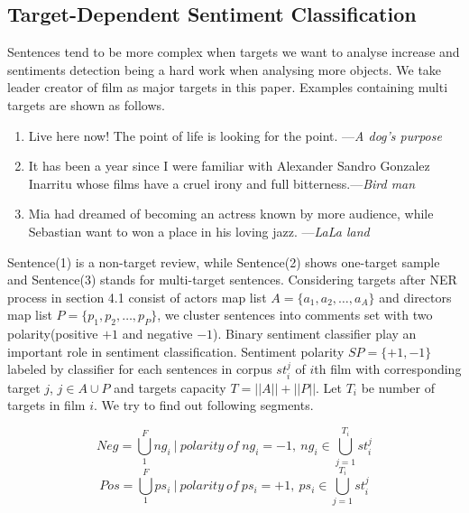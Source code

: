 \subsection{Target-Dependent Sentiment Classification}
\par Sentences tend to be more complex when targets we want to analyse increase and sentiments detection being a hard work when analysing more objects. We take leader creator of film as major targets in this paper. Examples containing multi targets are shown as follows.
\begin{enumerate}
  \item Live here now! The point of life is looking for the point. ---\emph{A dog's purpose}
  \item It has been a year since I were familiar with Alexander Sandro Gonzalez Inarritu whose films have a cruel irony and full bitterness.---\emph{Bird man}
  \item Mia had dreamed of becoming an actress known by more audience, while Sebastian want to won a place in his loving jazz. ---\emph{LaLa land}
\end{enumerate}
\par  Sentence(1) is a non-target review, while Sentence(2) shows one-target sample and Sentence(3) stands for multi-target sentences. Considering targets after NER process in section 4.1 consist of actors map list $A=\{a_1, a_2, \dots, a_A\}$ and directors map list $P=\{p_1, p_2, \dots, p_P\}$, we cluster sentences into comments set with two polarity(positive $+1$ and negative $-1$). Binary sentiment classifier play an important role in sentiment classification. Sentiment polarity $SP=\{+1, -1\}$ labeled by classifier for each sentences in corpus $st_i^j$ of $i$th film with corresponding target $j$, $j \in A \cup P $ and targets capacity $T = ||A||+||P||$. Let $T_i$ be number of targets in film $i$. We try to find out following segments.

\begin{equation}
    Neg=\bigcup_1^{F} ng_i \ | \ polarity \ of \ ng_i = -1, \ ng_i \in \bigcup_{j=1}^{T_i} st_i^j
    \label{eq:neg}
\end{equation}
\begin{equation}
    Pos=\bigcup_1^{F} ps_i \ | \ polarity \ of \ ps_i = +1, \ ps_i \in \bigcup_{j=1}^{T_i} st_i^j
    \label{eq:pos}
\end{equation}

